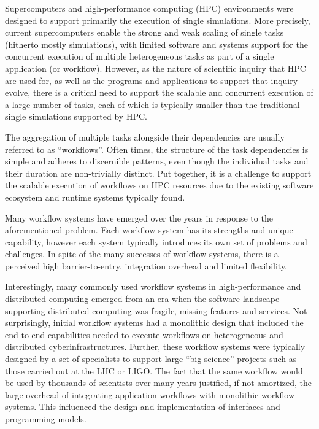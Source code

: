 
Supercomputers and high-performance computing (HPC) environments were
designed to support primarily the execution of single simulations. More
precisely, current supercomputers enable the strong and weak scaling of
single tasks (hitherto mostly simulations), with limited software and systems
support for the concurrent execution of multiple heterogeneous tasks as part
of a single application (or workflow). However, as the nature of scientific
inquiry that HPC are used for, as well as the programs and applications to
support that inquiry evolve, there is a critical need to support the scalable
and concurrent execution of a large number of tasks, each of which is
typically smaller than the traditional single simulations supported by HPC\@.

The aggregation of multiple tasks alongside their dependencies are usually
referred to as ``workflows''. Often times, the structure of the task
dependencies is simple and adheres to discernible patterns, even though the
individual tasks and their duration are non-trivially distinct. Put together,
it is a challenge to support the scalable execution of workflows on HPC
resources due to the existing software ecosystem and runtime systems
typically found.

Many workflow systems have emerged over the years in response to the
aforementioned problem. Each workflow system has its strengths and unique
capability, however each system typically introduces its own set of problems
and challenges. In spite of the many successes of workflow systems, there is
a perceived high barrier-to-entry, integration overhead and limited
flexibility.

Interestingly, many commonly used workflow systems in high-performance and
distributed computing emerged from an era when the software landscape
supporting distributed computing was fragile, missing features and services.
Not surprisingly, initial workflow systems had a monolithic design that
included the end-to-end capabilities needed to execute workflows on
heterogeneous and distributed cyberinfrastructures. Further, these workflow
systems were typically designed by a set of specialists to support large
``big science'' projects such as those carried out at the LHC or LIGO\@. The
fact that the same workflow would be used by thousands of scientists over
many years justified, if not amortized, the large overhead of integrating
application workflows with monolithic workflow systems. This influenced the
design and implementation of %
interfaces and programming models.

